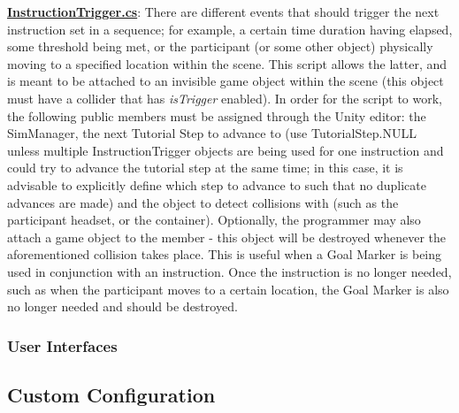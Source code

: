\documentclass{article}
\begin{document}
\href{https://bit.ly/2uwAQ1u}{\textbf{InstructionTrigger.cs}}: There are different events that should trigger the next instruction set in a sequence; for example, a certain time duration having elapsed, some threshold being met, or the participant (or some other object) physically moving to a specified location within the scene. This script allows the latter, and is meant to be attached to an invisible game object within the scene (this object must have a collider that has \textit{isTrigger} enabled). In order for the script to work, the following public members must be assigned through the Unity editor: the SimManager, the next Tutorial Step to advance to (use TutorialStep.NULL unless multiple InstructionTrigger objects are being used for one instruction and could try to advance the tutorial step at the same time; in this case, it is advisable to explicitly define which step to advance to such that no duplicate advances are made) and the object to detect collisions with (such as the participant headset, or the container). Optionally, the programmer may also attach a game object to the  member - this object will be destroyed whenever the aforementioned collision takes place. This is useful when a Goal Marker is being used in conjunction with an instruction. Once the instruction is no longer needed, such as when the participant moves to a certain location, the Goal Marker is also no longer needed and should be destroyed. \newline \newline


\subsubsection*{User Interfaces}



\subsection*{Custom Configuration} %
\end{document}
